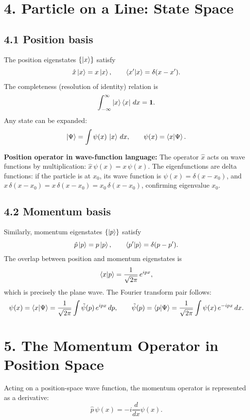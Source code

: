 \documentclass[12pt,a4paper]{article}
\begin{document}
\section{4. Particle on a Line: State Space}

\subsection{4.1 Position basis}
The position eigenstates $\{\ket{x}\}$ satisfy
\[
    \hat{x}\ket{x} = x\ket{x}, \qquad \braket{x'}{x} = \delta(x-x').
\]
The completeness (resolution of identity) relation is
\[
    \int_{-\infty}^{\infty}\ket{x}\bra{x}\,dx = \mathbf{1}.
\]
Any state can be expanded:
\[
    \ket{\Psi} = \int \psi(x)\,\ket{x}\,dx, \qquad \psi(x) = \braket{x}{\Psi}.
\]

\noindent\textbf{Position operator in wave-function language:} The operator $\hat{x}$ acts on wave functions by multiplication: $\hat{x}\,\psi(x)=x\,\psi(x)$.  The eigenfunctions are delta functions: if the particle is at $x_0$, its wave function is $\psi(x)=\delta(x-x_0)$, and $\hat{x}\,\delta(x-x_0)=x\,\delta(x-x_0)=x_0\,\delta(x-x_0)$, confirming eigenvalue $x_0$.

\subsection{4.2 Momentum basis}
Similarly, momentum eigenstates $\{\ket{p}\}$ satisfy
\[
    \hat{p}\ket{p} = p\ket{p}, \qquad \braket{p'}{p} = \delta(p-p').
\]
The overlap between position and momentum eigenstates is
\[
    \braket{x}{p} = \frac{1}{\sqrt{2\pi}}\,e^{ipx},
\]
which is precisely the plane wave.  The Fourier transform pair follows:
\[
    \psi(x) = \braket{x}{\Psi} = \frac{1}{\sqrt{2\pi}}\int \tilde{\psi}(p)\,e^{ipx}\,dp, \qquad
    \tilde{\psi}(p) = \braket{p}{\Psi} = \frac{1}{\sqrt{2\pi}}\int \psi(x)\,e^{-ipx}\,dx.
\]

\section{5. The Momentum Operator in Position Space}

Acting on a position-space wave function, the momentum operator is represented as a derivative:
\[
    \boxed{\hat{p}\,\psi(x) = -i\frac{d}{dx}\psi(x).}
\]
\end{document}
